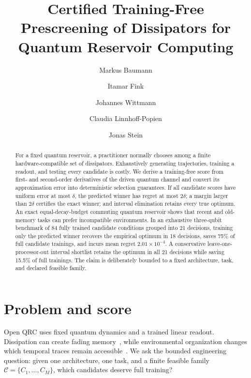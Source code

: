 \documentclass[a4paper,twocolumn,11pt,unpublished]{quantumarticle}
\begin{document}
\title{Certified Training-Free Prescreening of Dissipators for Quantum Reservoir Computing}
\author[qar,mobile]{Markus Baumann}
\author[mobile]{Itamar Fink}
\author[mobile]{Johannes Wittmann}
\author[qar,mobile]{Claudia Linnhoff-Popien}
\author[qar,mobile]{Jonas Stein}
\begin{abstract}
For a fixed quantum reservoir, a practitioner normally chooses among a finite
hardware-compatible set of dissipators. Exhaustively generating trajectories,
training a readout, and testing every candidate is costly. We derive a
training-free score from first- and second-order derivatives of the driven
quantum channel and convert its approximation error into deterministic
selection guarantees. If all candidate scores have uniform error at most
$\delta$, the predicted winner has regret at most $2\delta$; a margin larger
than $2\delta$ certifies the exact winner; and interval elimination retains
every true optimum. An exact equal-decay-budget commuting quantum reservoir
shows that recent and old-memory tasks can prefer incompatible environments.
In an exhaustive three-qubit benchmark of 84 fully trained candidate
conditions grouped into 21 decisions, training only the predicted winner
recovers the empirical optimum in 18 decisions, saves 75\% of full candidate
trainings, and incurs mean regret $2.01\times10^{-4}$. A conservative
leave-one-processor-out interval shortlist retains the optimum in all 21
decisions while saving 15.5\% of full trainings. The claim is deliberately
bounded to a fixed architecture, task, and declared feasible family.
\end{abstract}
\maketitle

\section{Problem and score}
Open QRC uses fixed quantum dynamics and a trained linear readout. Dissipation
can create fading memory~\cite{Sannia2024}, while environmental organization
changes which temporal traces remain accessible~\cite{Baumann2026}. We ask the
bounded engineering question: given one architecture, one task, and a finite
feasible family $\mathcal C=\{C_1,\ldots,C_M\}$, which candidates deserve full
training?
\end{document}
